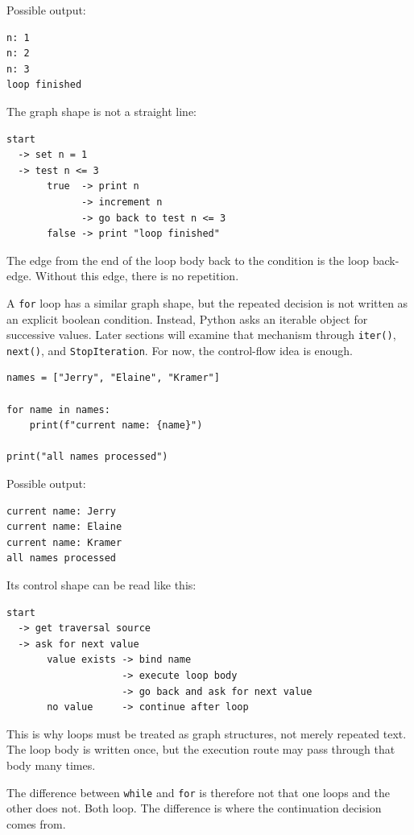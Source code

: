 Possible output:

\begin{verbatim}
n: 1
n: 2
n: 3
loop finished
\end{verbatim}

The graph shape is not a straight line:

\begin{verbatim}
start
  -> set n = 1
  -> test n <= 3
       true  -> print n
             -> increment n
             -> go back to test n <= 3
       false -> print "loop finished"
\end{verbatim}

The edge from the end of the loop body back to the condition is the loop back-edge. Without this edge, there is no repetition.

A \texttt{for} loop has a similar graph shape, but the repeated decision is not written as an explicit boolean condition. Instead, Python asks an iterable object for successive values. Later sections will examine that mechanism through \texttt{iter()}, \texttt{next()}, and \texttt{StopIteration}. For now, the control-flow idea is enough.

\begin{verbatim}
names = ["Jerry", "Elaine", "Kramer"]

for name in names:
    print(f"current name: {name}")

print("all names processed")
\end{verbatim}

Possible output:

\begin{verbatim}
current name: Jerry
current name: Elaine
current name: Kramer
all names processed
\end{verbatim}

Its control shape can be read like this:

\begin{verbatim}
start
  -> get traversal source
  -> ask for next value
       value exists -> bind name
                    -> execute loop body
                    -> go back and ask for next value
       no value     -> continue after loop
\end{verbatim}

This is why loops must be treated as graph structures, not merely repeated text. The loop body is written once, but the execution route may pass through that body many times.

The difference between \texttt{while} and \texttt{for} is therefore not that one loops and the other does not. Both loop. The difference is where the continuation decision comes from.


